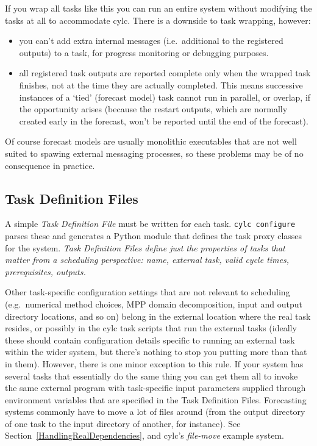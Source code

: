 \documentclass[11pt,a4paper]{article}
\begin{document}
If you wrap all tasks like this you can run an entire system without
modifying the tasks at all to accommodate cylc. There is a downside to
task wrapping, however:

\begin{itemize}
    \item you can't add extra internal messages (i.e.\ additional to the
        registered outputs) to a task, for progress monitoring or
        debugging purposes.
    \item all registered task outputs are reported complete only
        when the wrapped task finishes, not at the time they are actually
        completed. This means successive instances of a `tied' (forecast
        model) task cannot run in parallel, or overlap, if the
        opportunity arises (because the restart outputs, which are
        normally created early in the forecast, won't be reported until
        the end of the forecast).
\end{itemize} 

Of course forecast models are usually monolithic executables that are not
well suited to spawing external messaging processes, so these problems
may be of no consequence in practice.

\pagebreak

\subsection{Task Definition Files} 
\label{TaskDefinitionFiles}

A simple {\em Task Definition File} must be written for each task.
\lstinline=cylc configure= parses these and generates a Python module
that defines the task proxy classes for the system. {\em Task
Definition Files define just the properties of tasks that matter from a
scheduling perspective: name, external task, valid cycle times,
prerequisites, outputs.} 

Other task-specific configuration settings that are not relevant to
scheduling (e.g.\ numerical method choices, MPP
domain decomposition, input and output directory locations, and so on)
belong in the external location where the real task resides, or possibly
in the cylc task scripts that run the external tasks (ideally these
should contain configuration details specific to running an external
task within the wider system, but there's nothing to stop you putting
more than that in them). However, there is one minor exception to this
rule. If your system has several tasks that essentially do the same
thing you can get them all to invoke the same external program with
task-specific input parameters supplied through environment variables
that are specified in the Task Definition Files. Forecasting systems
commonly have to move a lot of files around (from the output
directory of one task to the input directory of another, for
instance). See Section~\ref{HandlingRealDependencies}, and cylc's
{\em file-move} example system. 
\end{document}
